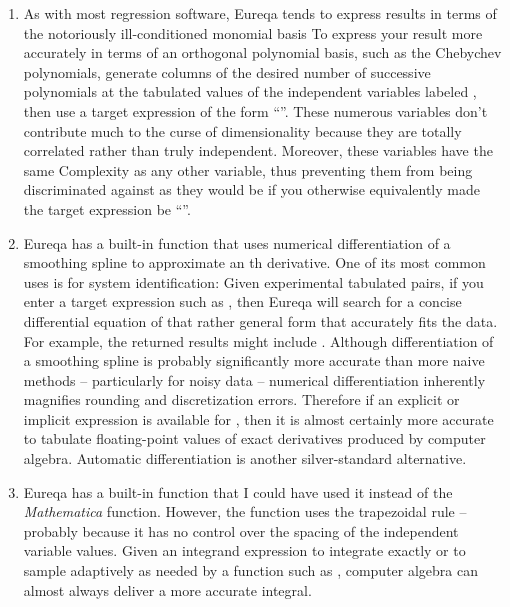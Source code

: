 \documentclass[12pt,english]{article}
\begin{document}
\begin{enumerate}
\item As with most regression software, Eureqa tends to express results
in terms of the notoriously ill-conditioned monomial basis 
To express your result more accurately in terms of an orthogonal polynomial
basis, such as the Chebychev  polynomials, generate columns of
the desired number of successive polynomials at the tabulated values
of the independent variables labeled , then use
a target expression of the form {}``''.
These numerous  variables don't contribute much to the curse
of dimensionality because they are totally correlated rather than
truly independent. Moreover, these variables have the same \textsf{Complexity}
as any other variable, thus preventing them from being discriminated
against as they would be if you otherwise equivalently made the target
expression be {}``''.\vspace{-5pt}

\item Eureqa has a built-in function 
that uses numerical differentiation of a smoothing spline to approximate
an th derivative. One of its most common uses is for system identification:
Given experimental tabulated   pairs, if you enter a target
expression such as , then Eureqa will search
for a concise differential equation of that rather general form that
accurately fits the data. For example, the returned results might
include . Although differentiation
of a smoothing spline is probably significantly more accurate than
more naive methods -- particularly for noisy data -- numerical differentiation
inherently magnifies rounding and discretization errors. Therefore
if an explicit or implicit expression is available for , then
it is almost certainly more accurate to tabulate floating-point values
of exact derivatives produced by computer algebra. Automatic differentiation
\cite{automaticDifferentiation} is another silver-standard alternative.
\vspace{-5pt}
 
\item Eureqa has a built-in  function that I
could have used it instead of the \textsl{Mathematica} 
function. However, the  function uses
the trapezoidal rule -- probably because it has no control over the
spacing of the independent variable values. Given an integrand expression
to integrate exactly or to sample adaptively as needed by a function
such as , computer algebra can almost
always deliver a more accurate integral.\vspace{-5pt}

\end{enumerate}
\end{document}
